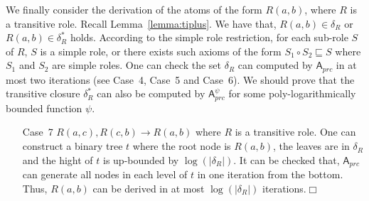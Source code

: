 \documentclass[final,1p,times]{elsarticle}
\begin{document}
We finally consider the derivation of the atoms of the form $R(a,b)$, where $R$
is a transitive role.
Recall Lemma~\ref{lemma:tiplus}. We have that, $R(a,b)\in\delta_R$ or
$R(a,b)\in\delta^*_R$ holds.
According to the simple role restriction, for each sub-role $S$ of $R$, $S$ is a simple role,
or there exists such axioms
of the form $S_1\circ S_2\sqsubseteq S$ where $S_1$ and $S_2$ are simple roles.
One can check the set $\delta_R$ can computed by $\mathsf{A}_{prc}$ in
at most two iterations (see Case~4, Case~5 and Case~6).
We should prove that the transitive closure $\delta^*_R$
can also be computed by $\mathsf{A}_{prc}^\psi$ for some
poly-logarithmically bounded function $\psi$.

\begin{enumerate}[leftmargin=12ex]
\item[Case~7] $R(a,c),R(c,b)\rightarrow R(a,b)$ where $R$ is a transitive role.
    One can construct a binary tree $t$ where the root node is $R(a,b)$,
    the leaves are in $\delta_R$ and the hight of $t$ is up-bounded by
    $\log(|\delta_R|)$. It can be checked that, $\mathsf{A}_{prc}$ can generate
    all nodes in each level of $t$ in one iteration from the bottom. Thus,
    $R(a,b)$ can be derived in at most $\log(|\delta_R|)$ iterations.\hfill$\Box$
\end{enumerate}
\end{document}
